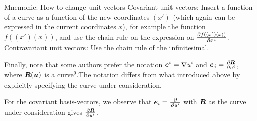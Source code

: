 \documentclass[a4paper, 12pt]{article}
\begin{document}
\vspace{0.5cm}
\begin{greenbox}{Mnemonic: How to change unit vectors}
 Covariant unit vectors: Insert a function of a curve as a function of the new
 coordinates $(x')$ (which again can be expressed in the current coordinates
 $x$), for example the function $f((x')(x))$, and use the chain rule on the
 expression on $\frac{\partial {f((x')(x))}}{\partial{x^i}}$.\\
 Contravariant unit vectors: Use the chain rule of the infinitesimal.
\end{greenbox}
%
Finally, note that some authors prefer the notation $\boldsymbol{e}^i =
\nabla u^i$ and $\boldsymbol{e}_i = \frac{\partial {\boldsymbol{R}}}{\partial{u^i}}$, where $\boldsymbol{R}(\boldsymbol{u})$ is a
curve\hyperref[note:curve]{$^9$}.The notation differs from what introduced
above by explicitly specifying the curve under consideration.

For the covariant basis-vectors, we observe that $\boldsymbol{e}_i = \frac{\partial {}}{\partial{u^i}}$
with $\boldsymbol{R}$ as the curve under consideration gives $\frac{\partial {\boldsymbol{R}}}{\partial{u^i}}$.
\end{document}

